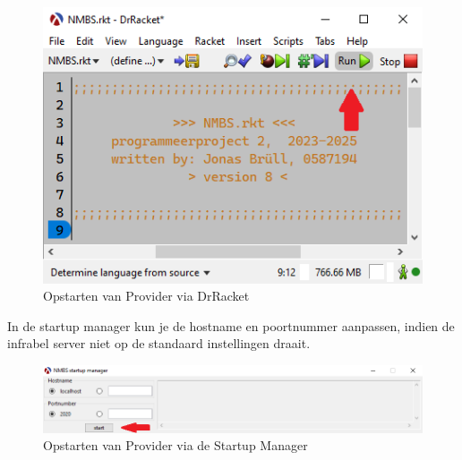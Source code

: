 \documentclass[a4paper, 11pt]{article}
\newcommand{\<}{\scriptsize\textless\normalsize}
\renewcommand{\>}{\scriptsize\textgreater\normalsize}
\begin{document}
\begin{figure}[h]
	\begin{center}
		\includegraphics[scale=.5]{Bestanden/provider.png}
		\caption{Opstarten van Provider via DrRacket}
	\end{center}
\end{figure}

In de startup manager kun je de hostname en poortnummer aanpassen, indien de infrabel server niet op de standaard instellingen draait.

\begin{figure}[h]
	\begin{center}
		\includegraphics[scale=.5]{Bestanden/provider-startup-rkt.png}
		\caption{Opstarten van Provider via de Startup Manager}
	\end{center}
\end{figure}

\label{lastpage}
\end{document}

